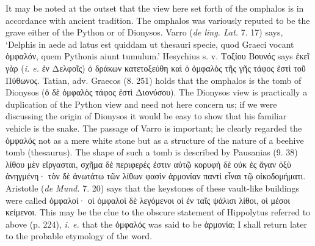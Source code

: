 \documentclass[a4paper, 11pt, oneside, polutonikogreek, english]{article}
\begin{document}
It may be noted at the outset that the view here set forth of the omphalos is in accordance with ancient tradition. The omphalos was variously reputed to be the grave either of the Python or of Dionysos. Varro (\emph{de ling. Lat.} 7. 17) says, `Delphis in aede ad latus est quiddam ut thesauri specie, quod Graeci vocant ὀμφαλόν, quem Pythonis aiunt tumulum.' Hesychius s. v. Τοξίου Βουνός says ἐκεῖ γὰρ (\emph{i. e.} ἐν Δελφοῖς) ὁ δράκων κατετοξεύθη καὶ ὁ ὀμφαλὸς τῆς γῆς τάφος ἐστὶ τοῦ Πύθωνος. Tatian, adv. Graecos (8. 251) holds that the omphalos is the tomb of Dionysos (ὁ δὲ ὀμφαλὸς τάφος ἐστὶ Διονύσου). The Dionysos view is practically a duplication of the Python view and need not here concern us; if we were discussing the origin of Dionysos it would be easy to show that his familiar vehicle is the snake. The passage of Varro is important; he clearly regarded the ὀμφαλός not as a mere white stone but as a structure of the nature of a beehive tomb (thesaurus). The shape of such a tomb is described by Pausanias (9. 38) λίθου μὲν εἴργασται, σχῆμα δὲ περιφερές ἐστιν αὐτῷ κορυφὴ δὲ οὐκ ἐς ἄγαν ὀξὺ ἀνηγμένη· τὸν δὲ ἀνωτάτω τῶν λίθων φασὶν ἁρμονίαν παντὶ εἶναι τῷ οἰκοδομήματι. Aristotle (\emph{de Mund.} 7. 20) says that the keystones of these vault-like buildings were called ὀμφαλοί· οἱ ὀμφαλοὶ δὲ λεγόμενοι οἱ ἐν ταῖς ψάλισι λίθοι, οἱ μέσοι κείμενοι. This may be the clue to the obscure statement of Hippolytus referred to above (p. 224), \emph{i. e.} that the ὀμφαλός was said to be ἁρμονία; I shall return later to the probable etymology of the word.
\end{document}
